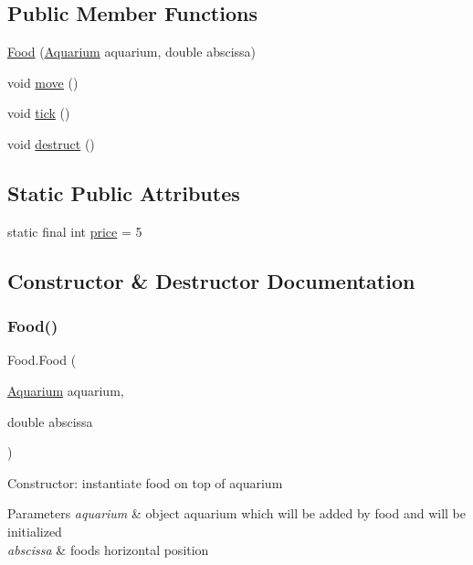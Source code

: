 \subsection*{Public Member Functions}
\begin{DoxyCompactItemize}
\item 
\mbox{\hyperlink{class_food_af84c4b93261d0dcb925a26b55ba7b1ab}{Food}} (\mbox{\hyperlink{class_aquarium}{Aquarium}} aquarium, double abscissa)
\item 
void \mbox{\hyperlink{class_food_a38349e35951c1eadc9d886a687d23e4b}{move}} ()
\item 
void \mbox{\hyperlink{class_food_ab522a31e92238355e7d3749228e5051d}{tick}} ()
\item 
void \mbox{\hyperlink{class_food_abe0571a139d7366a88e117aef6042e92}{destruct}} ()
\end{DoxyCompactItemize}
\subsection*{Static Public Attributes}
\begin{DoxyCompactItemize}
\item 
static final int \mbox{\hyperlink{class_food_ad3de4a04ccb2fac1edbd3e02d07f7773}{price}} = 5
\end{DoxyCompactItemize}


\subsection{Constructor \& Destructor Documentation}
\mbox{\label{class_food_af84c4b93261d0dcb925a26b55ba7b1ab}} 
\subsubsection{\texorpdfstring{Food()}{Food()}}
{\footnotesize\ttfamily Food.\+Food (\begin{DoxyParamCaption}\item[{\mbox{\hyperlink{class_aquarium}{Aquarium}}}]{aquarium,  }\item[{double}]{abscissa }\end{DoxyParamCaption})\hspace{0.3cm}{\ttfamily [inline]}}

Constructor\+: instantiate food on top of aquarium 
\begin{DoxyParams}{Parameters}
{\em aquarium} & object aquarium which will be added by food and will be initialized \\
\hline
{\em abscissa} & food\textquotesingle{}s horizontal position \\
\hline
\end{DoxyParams}



